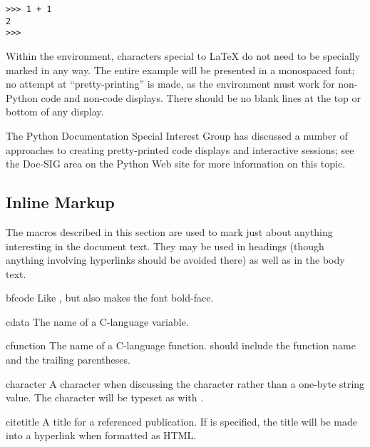 \documentclass{howto}
\begin{document}
\begin{verbatim}
>>> 1 + 1
2
>>> 
\end{verbatim}

    Within the  environment, characters special to
    \LaTeX{} do not need to be specially marked in any way.  The entire
    example will be presented in a monospaced font; no attempt at
    ``pretty-printing'' is made, as the environment must work for
    non-Python code and non-code displays.  There should be no blank
    lines at the top or bottom of any  display.

    The Python Documentation Special Interest Group has discussed a
    number of approaches to creating pretty-printed code displays and
    interactive sessions; see the Doc-SIG area on the Python Web site
    for more information on this topic.


  \subsection{Inline Markup}

    The macros described in this section are used to mark just about
    anything interesting in the document text.  They may be used in
    headings (though anything involving hyperlinks should be avoided
    there) as well as in the body text.

    \begin{macrodesc}{bfcode}{}
      Like , but also makes the font bold-face.
    \end{macrodesc}

    \begin{macrodesc}{cdata}{}
      The name of a C-language variable.
    \end{macrodesc}

    \begin{macrodesc}{cfunction}{}
      The name of a C-language function.   should include the
      function name and the trailing parentheses.
    \end{macrodesc}

    \begin{macrodesc}{character}{}
      A character when discussing the character rather than a one-byte
      string value.  The character will be typeset as with .
    \end{macrodesc}

    \begin{macrodesc}{citetitle}{}
      A title for a referenced publication.  If  is specified,
      the title will be made into a hyperlink when formatted as HTML.
    \end{macrodesc}
\end{document}
